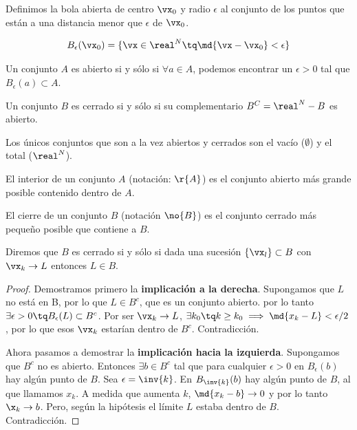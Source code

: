 \documentclass[nochap]{apuntes}
\begin{document}
\begin{defn}
Definimos la bola abierta de centro $\vx_0$ y radio $\epsilon$ al conjunto de los puntos que están a una distancia menor que $\epsilon$ de $\vx_0$.

\[B_\epsilon (\vx_0) = \{ \vx \in \real^N \tq \md{\vx-\vx_0} < \epsilon\}\]
\end{defn}

\begin{defn}
Un conjunto $A$ es abierto si y sólo si $\forall a\in A$, podemos encontrar un $\epsilon >0$ tal que $B_\epsilon(a)\subset A$.\end{defn}

\begin{defn}
Un conjunto $B$ es cerrado si y sólo si su complementario $B^C=\real^N-B$ es abierto.
\end{defn}

\begin{remark} Los únicos conjuntos que son a la vez abiertos y cerrados son el vacío ($\emptyset$) y el total ($\real^N$).\end{remark}

\begin{defn}[Interior] El interior de un conjunto $A$ (notación: $\r{A}$) es el conjunto abierto más grande posible contenido dentro de $A$.\end{defn}

\begin{defn}[Cierre] El cierre de un conjunto $B$ (notación $\no{B}$) es el conjunto cerrado más pequeño posible que contiene a $B$.\end{defn} 

\begin{theorem}
Diremos que $B$ es cerrado si y sólo si dada una sucesión $\{\vx_l\}\subset B$ con $\vx_k\to L$ entonces $L\in B$.
\end{theorem}

\begin{proof}
Demostramos primero la \textbf{implicación a la derecha}. Supongamos que $L$ no está en B, por lo que $L\in B^c$, que es un conjunto abierto. por lo tanto $\exists \epsilon >0 \tq B_\epsilon(L)\subset B^c$. Por ser $\vx_k \to L$, $\exists k_0 \tq k\geq k_0 \implies \md{x_k-L}<\epsilon / 2$, por lo que esos $\vx_k$ estarían dentro de $B^c$. Contradicción.

Ahora pasamos a demostrar la \textbf{implicación hacia la izquierda}. Supongamos que $B^c$ no es abierto. Entonces $\exists b \in B^c$ tal que para cualquier $\epsilon>0$ en $B_\epsilon(b)$ hay algún punto de $B$. Sea $\epsilon = \inv{k}$. En $B_\inv{k}(b)$ hay algún punto de $B$, al que llamamos $x_k$. A medida que aumenta $k$, $\md{x_k-b} \to 0$ y por lo tanto $\x_k \to b$. Pero, según la hipótesis el límite $L$  estaba dentro de $B$. Contradicción.
\end{proof}
\end{document}
